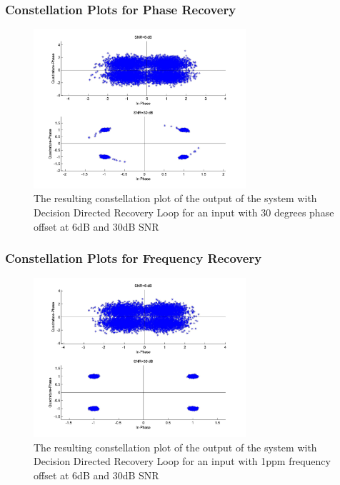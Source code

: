 \documentclass[]{article}
\begin{document}
\subsubsection{Constellation Plots  for Phase Recovery}
\begin{figure}[H]
\centering
\hspace*{-2cm}\includegraphics[width=0.7\textwidth]{qpConstpo_ddr1.jpg}
\caption{The resulting constellation plot of the output of the system with Decision Directed Recovery Loop for an input with 30 degrees phase offset at 6dB and 30dB SNR }
\end{figure}

\subsubsection{Constellation Plots  for Frequency Recovery}
\begin{figure}[H]
\centering
\hspace*{-2cm}\includegraphics[width=0.7\textwidth]{qpConstfo_ddr1.jpg}
\caption{The resulting constellation plot of the output of the system with Decision Directed Recovery Loop for an input with 1ppm frequency offset at 6dB and 30dB SNR }
\end{figure}
\end{document}
